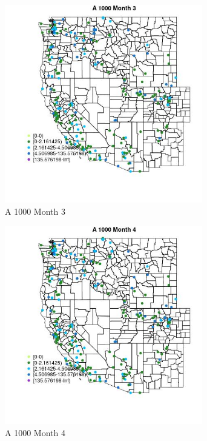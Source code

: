 \begin{figure} 
\centering  
\includegraphics[width=0.77\textwidth]{Code_Outputs/Report_ML_input_PM25_Step4_part_e_de_duplicated_aveswNAs_MapObsMo3A_1000.jpg} 
\caption{\label{fig:Report_ML_input_PM25_Step4_part_e_de_duplicated_aveswNAsMapObsMo3A_1000}A 1000 Month 3} 
\end{figure} 
 

\begin{figure} 
\centering  
\includegraphics[width=0.77\textwidth]{Code_Outputs/Report_ML_input_PM25_Step4_part_e_de_duplicated_aveswNAs_MapObsMo4A_1000.jpg} 
\caption{\label{fig:Report_ML_input_PM25_Step4_part_e_de_duplicated_aveswNAsMapObsMo4A_1000}A 1000 Month 4} 
\end{figure} 
 

